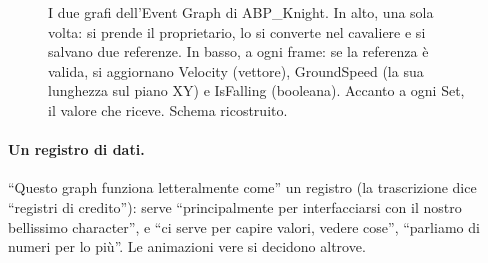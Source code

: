 \begin{figure}[htbp]
\caption{I due grafi dell'Event Graph di ABP\_Knight. In alto, una sola volta: si prende
il proprietario, lo si converte nel cavaliere e si salvano due referenze. In basso, a
ogni frame: se la referenza è valida, si aggiornano Velocity (vettore), GroundSpeed (la
sua lunghezza sul piano XY) e IsFalling (booleana). Accanto a ogni Set, il valore che riceve.
Schema ricostruito.}
\label{ue8:fig:abpgraph}
\end{figure}

\paragraph{Un registro di dati.} ``Questo graph funziona letteralmente come'' un
registro (la trascrizione dice ``registri di credito''): serve ``principalmente per
interfacciarsi con il nostro bellissimo character'', e ``ci serve per capire valori,
vedere cose'', ``parliamo di numeri per lo più''. Le animazioni vere si decidono altrove.

